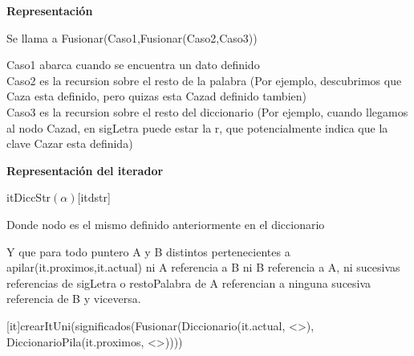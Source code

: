 \documentclass[a4paper,10pt]{article}
\newenvironment{Representacion}{%
  \vspace*{2ex}%
  \noindent\textbf{\Large Representación}%
  \vspace*{2ex}%
}{}
\begin{document}
\begin{Representacion}

\BlankLine

Se llama a Fusionar(Caso1,Fusionar(Caso2,Caso3)) 

 Caso1 abarca cuando se encuentra un dato definido \\ Caso2 es la recursion sobre el resto de la palabra (Por ejemplo, descubrimos que Caza esta definido, pero quizas esta Cazad definido tambien) \\ Caso3 es la recursion sobre el resto del diccionario (Por ejemplo, cuando llegamos al nodo Cazad, en sigLetra puede estar la r, que potencialmente indica que la clave Cazar esta definida)
\newline

\end{Representacion}



\textbf{Representación del iterador}

\begin{Estructura}{itDiccStr$(\alpha)$}[itdstr]
    \begin{Tupla}[itdstr]
    \end{Tupla}
  \end{Estructura}

Donde nodo es el mismo definido anteriormente en el diccionario

\mbox{}
  
\mbox{}  %

Y que para todo puntero A y B distintos pertenecientes a apilar(it.proximos,it.actual) ni A referencia a B ni B referencia a A, ni sucesivas referencias de sigLetra o restoPalabra de A referencian a ninguna sucesiva referencia de B y viceversa. \BlankLine

[it]{crearItUni(significados(Fusionar(Diccionario(it.actual, <>), DiccionarioPila(it.proximos, <>))))}	

\end{document}
